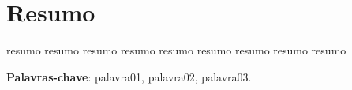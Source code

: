 \chapter{Resumo}
resumo resumo resumo
resumo resumo resumo
resumo resumo resumo

\vspace{.5cm}
\textbf{Palavras-chave}:
palavra01, palavra02, palavra03.
